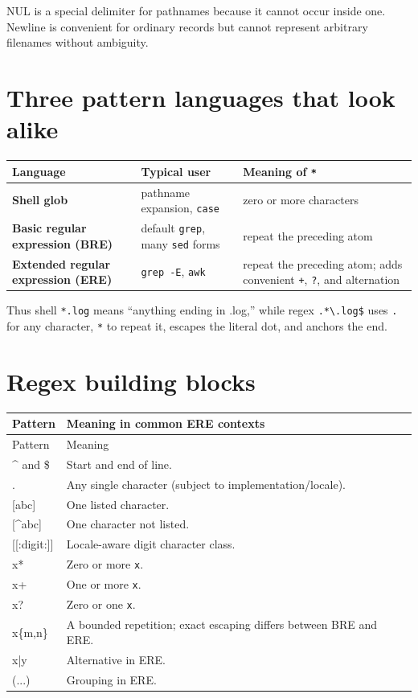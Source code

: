 \documentclass[11pt,oneside,openany]{book}
\begin{document}
NUL is a special delimiter for pathnames because it cannot occur inside one. Newline is convenient for ordinary records but cannot represent arbitrary filenames without ambiguity.

\section{Three pattern languages that look alike}
\begin{center}
\begin{tabularx}{0.96\textwidth}{>{\bfseries}p{}X X}
\toprule
Language & Typical user & Meaning of \texttt{*} \\
\midrule
Shell glob & pathname expansion, \texttt{case} & zero or more characters \\
Basic regular expression (BRE) & default \texttt{grep}, many \texttt{sed} forms & repeat the preceding atom \\
Extended regular expression (ERE) & \texttt{grep -E}, \texttt{awk} & repeat the preceding atom; adds convenient \texttt{+}, \texttt{?}, and alternation \\
\bottomrule
\end{tabularx}
\end{center}
Thus shell \texttt{*.log} means “anything ending in .log,” while regex \texttt{.*\textbackslash.log\$} uses \texttt{.} for any character, \texttt{*} to repeat it, escapes the literal dot, and anchors the end.

\section{Regex building blocks}
\begin{longtable}{>{\ttfamily}p{}p{}}
\toprule
Pattern & Meaning in common ERE contexts \\
\midrule
\endfirsthead\toprule Pattern & Meaning \\
\midrule\endhead
\textasciicircum{} and \$ & Start and end of line. \\
. & Any single character (subject to implementation/locale). \\
\mbox{[abc]} & One listed character. \\
\mbox{[\textasciicircum{}abc]} & One character not listed. \\
\mbox{[[:digit:]]} & Locale-aware digit character class. \\
x* & Zero or more \texttt{x}. \\
x+ & One or more \texttt{x}. \\
x? & Zero or one \texttt{x}. \\
x\{m,n\} & A bounded repetition; exact escaping differs between BRE and ERE. \\
x|y & Alternative in ERE. \\
(...) & Grouping in ERE. \\
\bottomrule
\end{longtable}
\end{document}
